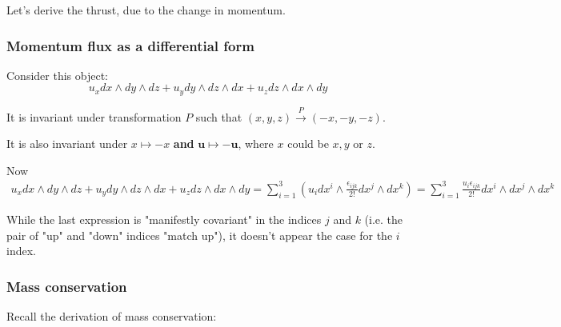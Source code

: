 \documentclass[10pt]{amsart}
\begin{document}
\begin{multicols*}{2}
Let's derive the thrust, due to the change in momentum.

\subsubsection{Momentum flux as a differential form}

Consider this object:
\[
u_x dx \wedge dy \wedge dz + u_y dy \wedge dz \wedge dx + u_z dz \wedge dx \wedge dy
\]

It is invariant under transformation $P$ such that $(x,y,z) \xrightarrow{P} (-x, -y, -z)$.

It is also invariant under $x \mapsto -x$ \textbf{and} $\mathbf{u} \mapsto -\mathbf{u}$, where $x$ could be $x, y$ or $z$.

Now
\[
\begin{gathered}
	u_x dx \wedge dy \wedge dz + u_y dy \wedge dz \wedge dx + u_z dz \wedge dx \wedge dy = \sum_{i=1}^3 \left( u_i dx^i \wedge \frac{\epsilon_{ijk}}{ 2!} dx^j \wedge dx^k \right) = \sum_{i=1}^3 \frac{u_i \epsilon_{ijk}}{ 2!} dx^i \wedge dx^j \wedge dx^k
\end{gathered}
\]

While the last expression is "manifestly covariant" in the indices $j$ and $k$ (i.e. the pair of "up" and "down" indices "match up"), it doesn't appear the case for the $i$ index. 



\subsubsection{Mass conservation}

Recall the derivation of mass conservation:


\end{multicols*}
\end{document}
